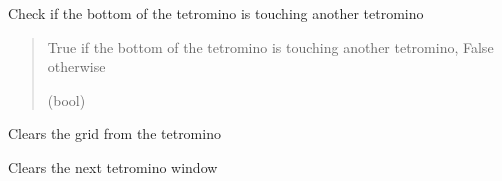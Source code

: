 \documentclass[letterpaper,10pt,english]{sphinxmanual}
\begin{document}
\begin{fulllineitems}
\begin{fulllineitems}
\end{fulllineitems}


\begin{fulllineitems}
\label{\detokenize{tetris.tetrominos:tetris.tetrominos.Tetromino.check_touch}}
\pysigstartsignatures
{}
\pysigstopsignatures
\sphinxAtStartPar
Check if the bottom of the tetromino is touching another tetromino
\begin{quote}\begin{description}
\sphinxAtStartPar
True if the bottom of the tetromino is touching another tetromino, False otherwise

\sphinxAtStartPar
(bool)

\end{description}\end{quote}

\end{fulllineitems}


\begin{fulllineitems}
\label{\detokenize{tetris.tetrominos:tetris.tetrominos.Tetromino.clear}}
\pysigstartsignatures
{}
\pysigstopsignatures
\sphinxAtStartPar
Clears the grid from the tetromino

\end{fulllineitems}


\begin{fulllineitems}
\label{\detokenize{tetris.tetrominos:tetris.tetrominos.Tetromino.clear_next_tetromino_window}}
\pysigstartsignatures
{}
\pysigstopsignatures
\sphinxAtStartPar
Clears the next tetromino window

\end{fulllineitems}


\end{fulllineitems}
\end{document}
